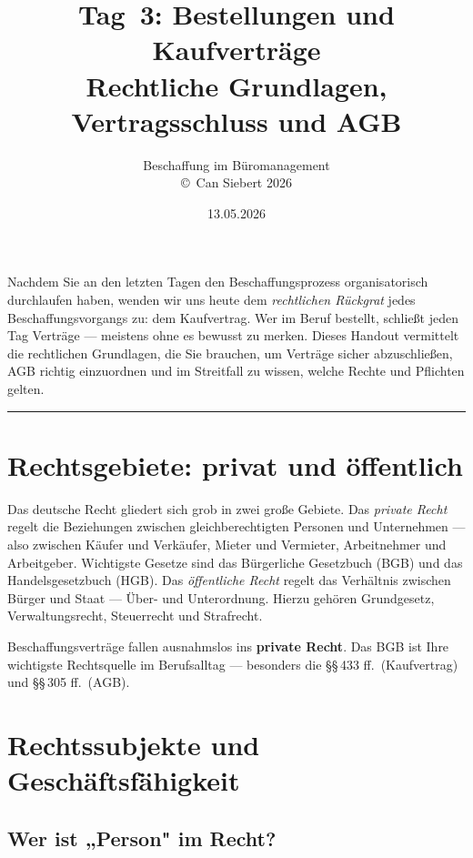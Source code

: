 \documentclass[11pt, a4paper]{article}
\title{\vspace*{-1.5cm}\Huge\bfseries\color{bfwPrimaryDark}Tag~3: Bestellungen und Kaufverträge\\[0.4em]
  \large\color{bfwInkSoft}\textnormal{Rechtliche Grundlagen, Vertragsschluss und AGB}}
\author{\textsf{Beschaffung im Büromanagement}\\
\textsf{\small\copyright\ Can Siebert\,\textperiodcentered\,2026}}
\date{13.05.2026}
\begin{document}
\maketitle
\thispagestyle{empty}

\vspace{1em}
\begin{merksatz}[title={\bfseries Worum geht es heute?}]
Nachdem Sie an den letzten Tagen den Beschaffungsprozess organisatorisch durchlaufen
haben, wenden wir uns heute dem \emph{rechtlichen Rückgrat} jedes Beschaffungs­vorgangs
zu: dem Kaufvertrag. Wer im Beruf bestellt, schließt jeden Tag Verträge --- meistens
ohne es bewusst zu merken. Dieses Handout vermittelt die rechtlichen Grundlagen, die
Sie brauchen, um Verträge sicher abzuschließen, AGB richtig einzuordnen und im Streitfall
zu wissen, welche Rechte und Pflichten gelten.
\end{merksatz}

\tableofcontents
\vspace{1em}
\hrule
\vspace{1em}

\section{Rechtsgebiete: privat und öffentlich}

Das deutsche Recht gliedert sich grob in zwei große Gebiete. Das \emph{private Recht}
regelt die Beziehungen zwischen gleichberechtigten Personen und Unternehmen --- also
zwischen Käufer und Verkäufer, Mieter und Vermieter, Arbeitnehmer und Arbeitgeber.
Wichtigste Gesetze sind das Bürgerliche Gesetzbuch (BGB) und das Handelsgesetzbuch (HGB).
Das \emph{öffentliche Recht} regelt das Verhältnis zwischen Bürger und Staat ---
Über- und Unterordnung. Hierzu gehören Grundgesetz, Verwaltungsrecht, Steuerrecht und
Strafrecht.

\begin{merksatz}
Beschaffungs­verträge fallen ausnahmslos ins \textbf{private Recht}. Das BGB ist Ihre
wichtigste Rechtsquelle im Berufsalltag --- besonders die §§\,433 ff.\ (Kaufvertrag) und
§§\,305 ff.\ (AGB).
\end{merksatz}

\section{Rechtssubjekte und Geschäftsfähigkeit}

\subsection{Wer ist „Person" im Recht?}
\end{document}
